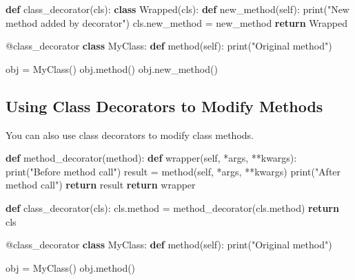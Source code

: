 \documentclass[
  letterpaper,
  DIV=11,
  numbers=noendperiod]{scrreprt}
\newenvironment{Shaded}{\begin{snugshade}}{\end{snugshade}}
\newcommand{\AttributeTok}[1]{\textcolor[rgb]{0.40,0.45,0.13}{#1}}
\newcommand{\BuiltInTok}[1]{\textcolor[rgb]{0.00,0.23,0.31}{#1}}
\newcommand{\ControlFlowTok}[1]{\textcolor[rgb]{0.00,0.23,0.31}{\textbf{#1}}}
\newcommand{\KeywordTok}[1]{\textcolor[rgb]{0.00,0.23,0.31}{\textbf{#1}}}
\newcommand{\NormalTok}[1]{\textcolor[rgb]{0.00,0.23,0.31}{#1}}
\newcommand{\OperatorTok}[1]{\textcolor[rgb]{0.37,0.37,0.37}{#1}}
\newcommand{\StringTok}[1]{\textcolor[rgb]{0.13,0.47,0.30}{#1}}
\newcommand{\VariableTok}[1]{\textcolor[rgb]{0.07,0.07,0.07}{#1}}
\begin{document}
\begin{Shaded}
\begin{Highlighting}[]
\KeywordTok{def}\NormalTok{ class\_decorator(cls):}
    \KeywordTok{class}\NormalTok{ Wrapped(cls):}
        \KeywordTok{def}\NormalTok{ new\_method(}\VariableTok{self}\NormalTok{):}
            \BuiltInTok{print}\NormalTok{(}\StringTok{"New method added by decorator"}\NormalTok{)}
\NormalTok{        cls.new\_method }\OperatorTok{=}\NormalTok{ new\_method}
    \ControlFlowTok{return}\NormalTok{ Wrapped}

\AttributeTok{@class\_decorator}
\KeywordTok{class}\NormalTok{ MyClass:}
    \KeywordTok{def}\NormalTok{ method(}\VariableTok{self}\NormalTok{):}
        \BuiltInTok{print}\NormalTok{(}\StringTok{"Original method"}\NormalTok{)}

\NormalTok{obj }\OperatorTok{=}\NormalTok{ MyClass()}
\NormalTok{obj.method()}
\NormalTok{obj.new\_method()}
\end{Highlighting}
\end{Shaded}

\subsection{Using Class Decorators to Modify
Methods}\label{using-class-decorators-to-modify-methods}

You can also use class decorators to modify class methods.

\begin{Shaded}
\begin{Highlighting}[]
\KeywordTok{def}\NormalTok{ method\_decorator(method):}
    \KeywordTok{def}\NormalTok{ wrapper(}\VariableTok{self}\NormalTok{, }\OperatorTok{*}\NormalTok{args, }\OperatorTok{**}\NormalTok{kwargs):}
        \BuiltInTok{print}\NormalTok{(}\StringTok{"Before method call"}\NormalTok{)}
\NormalTok{        result }\OperatorTok{=}\NormalTok{ method(}\VariableTok{self}\NormalTok{, }\OperatorTok{*}\NormalTok{args, }\OperatorTok{**}\NormalTok{kwargs)}
        \BuiltInTok{print}\NormalTok{(}\StringTok{"After method call"}\NormalTok{)}
        \ControlFlowTok{return}\NormalTok{ result}
    \ControlFlowTok{return}\NormalTok{ wrapper}

\KeywordTok{def}\NormalTok{ class\_decorator(cls):}
\NormalTok{    cls.method }\OperatorTok{=}\NormalTok{ method\_decorator(cls.method)}
    \ControlFlowTok{return}\NormalTok{ cls}

\AttributeTok{@class\_decorator}
\KeywordTok{class}\NormalTok{ MyClass:}
    \KeywordTok{def}\NormalTok{ method(}\VariableTok{self}\NormalTok{):}
        \BuiltInTok{print}\NormalTok{(}\StringTok{"Original method"}\NormalTok{)}

\NormalTok{obj }\OperatorTok{=}\NormalTok{ MyClass()}
\NormalTok{obj.method()}
\end{Highlighting}
\end{Shaded}
\end{document}
